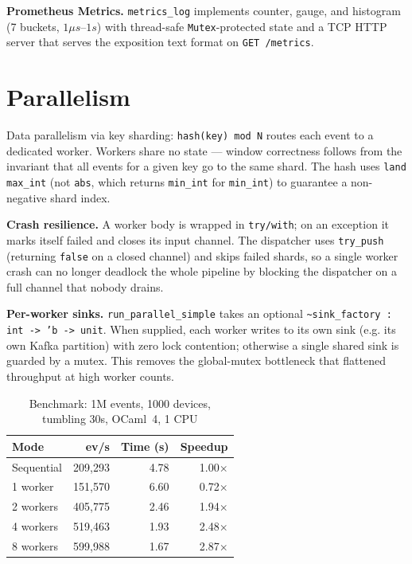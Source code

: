 \documentclass[11pt,a4paper]{article}
\begin{document}
\textbf{Prometheus Metrics.} \texttt{metrics\_log} implements
counter, gauge, and histogram (7 buckets, $1\mu s$--$1s$) with
thread-safe \texttt{Mutex}-protected state and a TCP HTTP server
that serves the exposition text format on \texttt{GET /metrics}.

\section{Parallelism}

Data parallelism via key sharding: \texttt{hash(key) mod N} routes
each event to a dedicated worker. Workers share no state — window
correctness follows from the invariant that all events for a given
key go to the same shard. The hash uses \texttt{land max\_int} (not
\texttt{abs}, which returns \texttt{min\_int} for \texttt{min\_int})
to guarantee a non-negative shard index.

\textbf{Crash resilience.} A worker body is wrapped in
\texttt{try/with}; on an exception it marks itself failed and closes
its input channel. The dispatcher uses \texttt{try\_push} (returning
\texttt{false} on a closed channel) and skips failed shards, so a
single worker crash can no longer deadlock the whole pipeline by
blocking the dispatcher on a full channel that nobody drains.

\textbf{Per-worker sinks.} \texttt{run\_parallel\_simple} takes an
optional \texttt{\textasciitilde{}sink\_factory : int -> 'b -> unit}.
When supplied, each worker writes to its own sink (e.g. its own Kafka
partition) with zero lock contention; otherwise a single shared sink is
guarded by a mutex. This removes the global-mutex bottleneck that
flattened throughput at high worker counts.

\begin{table}[h]
\centering
\caption{Benchmark: 1M events, 1000 devices, tumbling 30s, OCaml~4, 1 CPU}
\begin{tabular}{lrrr}
\toprule
Mode & ev/s & Time (s) & Speedup \\
\midrule
Sequential    & 209{,}293 & 4.78 & 1.00$\times$ \\
1 worker      & 151{,}570 & 6.60 & 0.72$\times$ \\
2 workers     & 405{,}775 & 2.46 & 1.94$\times$ \\
4 workers     & 519{,}463 & 1.93 & 2.48$\times$ \\
8 workers     & 599{,}988 & 1.67 & 2.87$\times$ \\
\bottomrule
\end{tabular}
\end{table}
\end{document}
